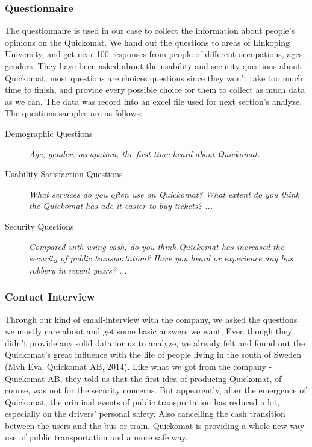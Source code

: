 \documentclass[twocolumn]{article}
\begin{document}
\subsubsection{Questionnaire}
The questionnaire is used in our case to collect the information about people’s opinions on the Quickomat. We hand out the questions to areas of Linkoping University, and get near 100 responses from people of different occupations, ages, genders. They have been asked about the usability and security questions about Quickomat, most questions are choices questions since they won’t take too much time to finish, and provide every possible choice for them to collect as much data as we can. The data was record into an excel file used for next section’s analyze. The questions samples are as follows:
\begin{description}
\item[Demographic Questions]
    \emph{Age, gender, occupation, the first time heard about Quickomat.}
\item[Usability Satisfaction Questions]
    \emph{What services do you often use on Quickomat?}
    \emph{What extent do you think the Quickomat has ade it easier to buy tickets?}
    \emph{...}
\item[Security Questions]
    \emph{Compared with using cash, do you think Quickomat has increased the security of public transportation?}
    \emph{Have you heard or experience any bus robbery in recent years?}
    \emph{...}
\end{description}

\subsubsection{Contact Interview}
Through our kind of email-interview with the company, we asked the questions we mostly care about and get some basic answers we want, Even though they didn't provide any solid data for us to analyze, we already felt and found out the Quickomat's great influence with the life of people living in the south of Sweden (Mvh Eva, Quickomat AB, 2014).
Like what we got from the company - Quickomat AB, they told us that the first idea of producing Quickomat, of course, was not for the security concerns. But appearently, after the emergence of Quickomat, the criminal events of public transportation has reduced a lot, especially on the drivers' personal safety. Also cancelling the cash transition between the users and the bus or train, Quickomat is providing a whole new way use of public transportation and a more safe way.
\end{document}
